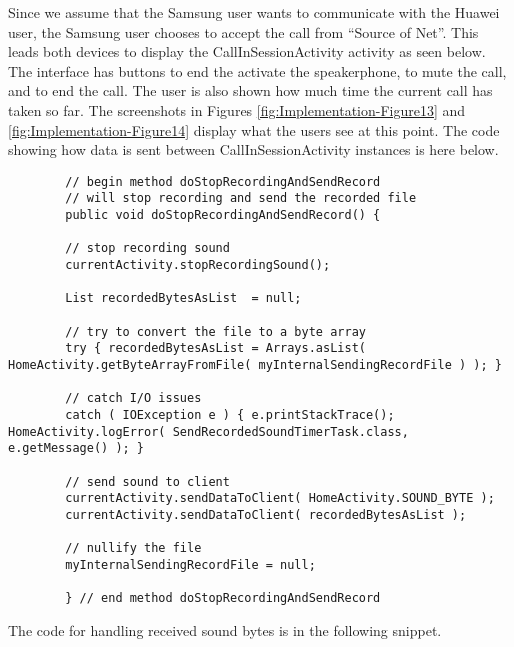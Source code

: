 \documentclass[12pt,svgnames,smaller]{article} %
\begin{document}
		Since we assume that the Samsung user wants to communicate with the Huawei user, the Samsung user chooses to accept the call from “Source of Net”. This leads both devices to display the CallInSessionActivity activity as seen below. The interface has buttons to end the activate the speakerphone, to mute the call, and to end the call. The user is also shown how much time the current call has taken so far. The screenshots in Figures \ref{fig:Implementation-Figure13} and \ref{fig:Implementation-Figure14} display what the users see at this point. The code showing how data is sent between CallInSessionActivity instances is here below.
		
		\begin{verbatim}
		// begin method doStopRecordingAndSendRecord
		// will stop recording and send the recorded file
		public void doStopRecordingAndSendRecord() {
		
		// stop recording sound
		currentActivity.stopRecordingSound();
		
		List recordedBytesAsList  = null;
		
		// try to convert the file to a byte array
		try { recordedBytesAsList = Arrays.asList( HomeActivity.getByteArrayFromFile( myInternalSendingRecordFile ) ); }
		
		// catch I/O issues
		catch ( IOException e ) { e.printStackTrace(); HomeActivity.logError( SendRecordedSoundTimerTask.class, e.getMessage() ); }
		
		// send sound to client
		currentActivity.sendDataToClient( HomeActivity.SOUND_BYTE );
		currentActivity.sendDataToClient( recordedBytesAsList );
		
		// nullify the file
		myInternalSendingRecordFile = null;
		
		} // end method doStopRecordingAndSendRecord		    
		\end{verbatim}
		
		The code for handling received sound bytes is in the following snippet.
		
\end{document}
